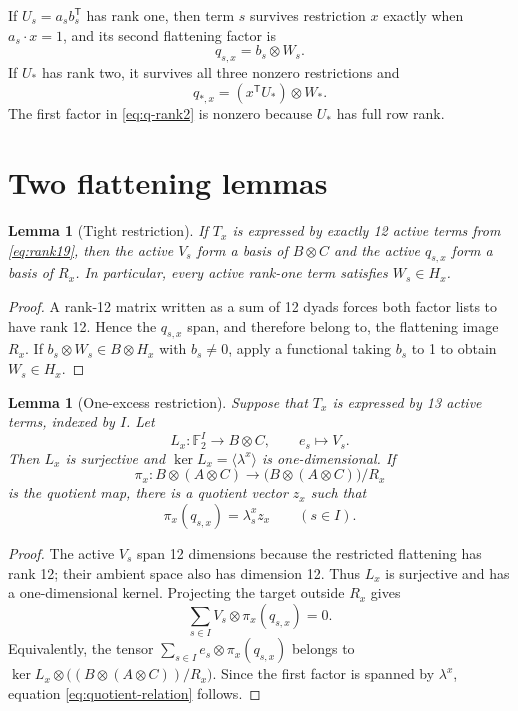 \documentclass[10pt]{article}
\newtheorem{lemma}[theorem]{Lemma}
\theoremstyle{remark}
\newcommand{\F}{\mathbb F}
\begin{document}
If $U_s=a_sb_s^{\mathsf T}$ has rank one, then term $s$ survives restriction
$x$ exactly when $a_s\mathbin{\cdot}x=1$, and its second flattening factor is
\begin{equation}\label{eq:q-rank1}
 q_{s,x}=b_s\otimes W_s.
\end{equation}
If $U_*$ has rank two, it survives all three nonzero restrictions and
\begin{equation}\label{eq:q-rank2}
 q_{*,x}=(x^{\mathsf T}U_*)\otimes W_*.
\end{equation}
The first factor in \eqref{eq:q-rank2} is nonzero because $U_*$ has full row
rank.

\section{Two flattening lemmas}

\begin{lemma}[Tight restriction]\label{lem:tight}
If $T_x$ is expressed by exactly 12 active terms from
\eqref{eq:rank19}, then the active $V_s$ form a basis of $B\otimes C$ and the
active $q_{s,x}$ form a basis of $R_x$.  In particular, every active rank-one
term satisfies $W_s\in H_x$.
\end{lemma}

\begin{proof}
A rank-12 matrix written as a sum of 12 dyads forces both factor lists to have
rank 12.  Hence the $q_{s,x}$ span, and therefore belong to, the flattening
image $R_x$.  If $b_s\otimes W_s\in B\otimes H_x$ with $b_s\neq0$, apply a
functional taking $b_s$ to 1 to obtain $W_s\in H_x$.
\end{proof}

\begin{lemma}[One-excess restriction]\label{lem:excess}
Suppose that $T_x$ is expressed by 13 active terms, indexed by $I$.  Let
\[
 L_x:\F_2^I\longrightarrow B\otimes C,
 \qquad e_s\longmapsto V_s.
\]
Then $L_x$ is surjective and
$\ker L_x=\langle\lambda^x\rangle$ is one-dimensional.  If
\[
 \pi_x:B\otimes(A\otimes C)\longrightarrow
 \bigl(B\otimes(A\otimes C)\bigr)/R_x
\]
is the quotient map, there is a quotient vector $z_x$ such that
\begin{equation}\label{eq:quotient-relation}
 \pi_x(q_{s,x})=\lambda_s^x z_x\qquad(s\in I).
\end{equation}
\end{lemma}

\begin{proof}
The active $V_s$ span 12 dimensions because the restricted flattening has rank
12; their ambient space also has dimension 12.  Thus $L_x$ is surjective and
has a one-dimensional kernel.  Projecting the target outside $R_x$ gives
\[
 \sum_{s\in I}V_s\otimes\pi_x(q_{s,x})=0.
\]
Equivalently, the tensor
$\sum_{s\in I}e_s\otimes\pi_x(q_{s,x})$ belongs to
$\ker L_x\otimes\bigl((B\otimes(A\otimes C))/R_x\bigr)$.  Since the first
factor is spanned by $\lambda^x$, equation
\eqref{eq:quotient-relation} follows.
\end{proof}
\end{document}

